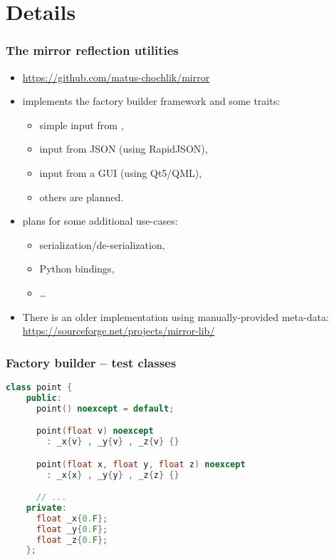 \documentclass[compress,table,xcolor=table]{beamer}
\begin{document}
\section{Details}
\begin{frame}[fragile]
\frametitle{The mirror reflection utilities}
    \Large
    \begin{itemize}
        \item \url{https://github.com/matus-chochlik/mirror}
        \item implements the factory builder framework and some traits:
        \begin{itemize}
            \large
            \item simple input from \verb@iostreams@,
            \item input from JSON (using RapidJSON),
            \item input from a GUI (using Qt5/QML),
            \item others are planned.
        \end{itemize}
        \item plans for some additional use-cases:
        \begin{itemize}
            \large
            \item serialization/de-serialization,
            \item Python bindings,
            \item \ldots
        \end{itemize}
        \item There is an older implementation using manually-provided meta-data:
            \url{https://sourceforge.net/projects/mirror-lib/}
    \end{itemize}
\end{frame}
\begin{frame}[fragile]
\frametitle{Factory builder -- test classes}
    \begin{lstlisting}[language=c++]
    class point {
    public:
      point() noexcept = default;

      point(float v) noexcept
        : _x{v} , _y{v} , _z{v} {}

      point(float x, float y, float z) noexcept
        : _x{x} , _y{y} , _z{z} {}

      // ...
    private:
      float _x{0.F};
      float _y{0.F};
      float _z{0.F};
    };
    \end{lstlisting}
\end{frame}
\end{document}
